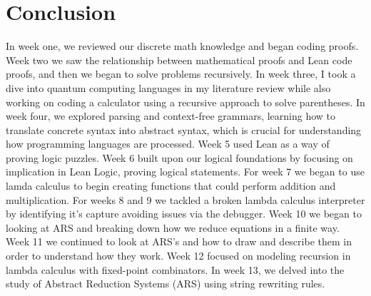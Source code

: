 \documentclass{article}
\begin{document}
\section*{Conclusion}
In week one, we reviewed our discrete math knowledge and began coding proofs. Week two we saw the relationship between mathematical proofs and Lean code proofs, and then we began to solve problems recursively. In week three, I took a dive into quantum computing languages in my literature review while also working on coding a calculator using a recursive approach to solve parentheses. In week four, we explored parsing and context-free grammars, learning how to translate concrete syntax into abstract syntax, which is crucial for understanding how programming languages are processed. Week 5 used Lean as a way of proving logic puzzles. Week 6 built upon our logical foundations by focusing on implication in Lean Logic, proving logical statements. For week 7 we began to use lamda calculus to begin creating functions that could perform addition and multiplication. For weeks 8 and 9 we tackled a broken lambda calculus interpreter by identifying it's capture avoiding issues via the debugger. Week 10 we began to looking at ARS and breaking down how we reduce equations in a finite way. Week 11 we continued to look at ARS's and how to draw and describe them in order to understand how they work. Week 12 focused on modeling recursion in lambda calculus with fixed-point combinators. In week 13, we delved into the study of Abstract Reduction Systems (ARS) using string rewriting rules.
\end{document}
